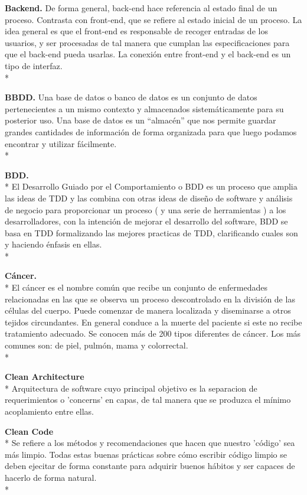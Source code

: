 \documentclass[../pfc.tex]{subfiles}
\begin{document}
	\textbf{Backend.}
	De forma general, back-end hace referencia al estado final de un proceso. Contrasta con front-end, que se refiere al estado inicial de un proceso. 
	La idea general es que el front-end es responsable de recoger entradas de los usuarios, y ser procesadas de tal manera que cumplan las especificaciones para que el back-end pueda usarlas. La conexión entre front-end y el back-end es un tipo de interfaz.\\*
	
	\textbf{BBDD.}
	Una base de datos o banco de datos es un conjunto de datos pertenecientes a un mismo
	contexto y almacenados sistemáticamente para su posterior uso. Una base de datos es un “almacén”
	que nos permite guardar grandes cantidades de información de forma organizada para que luego
	podamos encontrar y utilizar fácilmente.\\*
	
	\textbf{BDD.}\\*
	El Desarrollo Guiado por el Comportamiento o BDD es un proceso que amplia las ideas de TDD y las combina con otras ideas de diseño de software y análisis de negocio para proporcionar un proceso ( y una serie de herramientas ) a los desarrolladores, con la intención de mejorar el desarrollo del software, BDD se basa en TDD formalizando las mejores practicas de TDD, clarificando cuales son y haciendo énfasis en ellas.\\*
	
	\textbf{Cáncer.}\\*
	El cáncer es el nombre común que recibe un conjunto de enfermedades relacionadas en las que se observa un proceso descontrolado en la división de las células del cuerpo. Puede comenzar de manera localizada y diseminarse a otros tejidos circundantes. En general conduce a la muerte del paciente si este no recibe tratamiento adecuado. Se conocen más de 200 tipos diferentes de cáncer. Los más comunes son: de piel, pulmón, mama y colorrectal.\\*
	
	\textbf{Clean Architecture}\\*
	Arquitectura de software cuyo principal objetivo es la separacion de requerimientos o 'concerns' en capas, de tal manera que se produzca el mínimo acoplamiento entre ellas.
	
	\textbf{Clean Code}	\\*
	Se refiere a los métodos y recomendaciones que hacen que nuestro 'código' sea más limpio. Todas estas buenas prácticas sobre cómo escribir código limpio se deben ejecitar de forma constante para adquirir buenos hábitos y ser capaces de hacerlo de forma natural.\\* 
	
\end{document}
